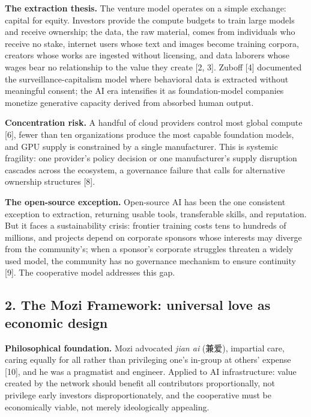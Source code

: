 \textbf{The extraction thesis.} The venture model operates on a simple
exchange: capital for equity. Investors provide the compute budgets to
train large models and receive ownership; the data, the raw material,
comes from individuals who receive no stake, internet users whose text
and images become training corpora, creators whose works are ingested
without licensing, and data laborers whose wages bear no relationship to
the value they create {[}2, 3{]}. Zuboff {[}4{]} documented the
surveillance-capitalism model where behavioral data is extracted without
meaningful consent; the AI era intensifies it as foundation-model
companies monetize generative capacity derived from absorbed human
output.

\textbf{Concentration risk.} A handful of cloud providers control most
global compute {[}6{]}, fewer than ten organizations produce the most
capable foundation models, and GPU supply is constrained by a single
manufacturer. This is systemic fragility: one provider's policy decision
or one manufacturer's supply disruption cascades across the ecosystem, a
governance failure that calls for alternative ownership structures
{[}8{]}.

\textbf{The open-source exception.} Open-source AI has been the one
consistent exception to extraction, returning usable tools, transferable
skills, and reputation. But it faces a sustainability crisis: frontier
training costs tens to hundreds of millions, and projects depend on
corporate sponsors whose interests may diverge from the community's;
when a sponsor's corporate struggles threaten a widely used model, the
community has no governance mechanism to ensure continuity {[}9{]}. The
cooperative model addresses this gap.

\subsection{2. The Mozi Framework: universal love as economic
design}\label{the-mozi-framework-universal-love-as-economic-design}

\textbf{Philosophical foundation.} Mozi advocated \emph{jian ai} (兼爱),
impartial care, caring equally for all rather than privileging one's
in-group at others' expense {[}10{]}, and he was a pragmatist and
engineer. Applied to AI infrastructure: value created by the network
should benefit all contributors proportionally, not privilege early
investors disproportionately, and the cooperative must be economically
viable, not merely ideologically appealing.

